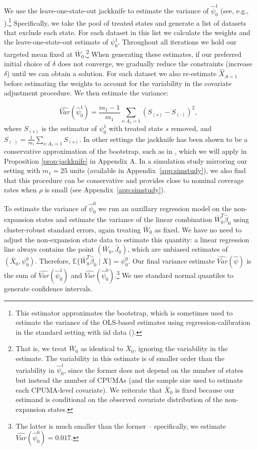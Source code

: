 \documentclass[aoas]{imsart}
\theoremstyle{plain}
\theoremstyle{remark}
\begin{document}
We use the leave-one-state-out jackknife to estimate the variance of $\hat{\psi}_0^1$ (see, e.g., \cite{cameron2015practitioner}).\footnote{This estimator approximates the bootstrap, which is sometimes used to estimate the variance of the OLS-based estimates using regression-calibration in the standard setting with iid data (\cite{carroll2006measurement}).} Specifically, we take the pool of treated states and generate a list of datasets that exclude each state. For each dataset in this list we calculate the weights and the leave-one-state-out estimate of $\psi_0^1$. Throughout all iterations we hold our targeted mean fixed at $\bar{W}_0$.\footnote{That is, we treat $\bar{W}_0$ as identical to $\bar{X}_0$, ignoring the variability in the estimate. The variability in this estimate is of smaller order than the variability in $\hat{\psi}_0^1$, since the former does not depend on the number of states but instead the number of CPUMAs (and the sample size used to estimate each CPUMA-level covariate). We reiterate that $\bar{X}_0$ is fixed because our estimand is conditional on the observed covariate distribution of the non-expansion states.} When generating these estimates, if our preferred initial choice of $\delta$ does not converge, we gradually reduce the constraints (increase $\delta$) until we can obtain a solution. For each dataset we also re-estimate $\hat{X}_{A=1}$ before estimating the weights to account for the variability in the covariate adjustment procedure. We then estimate the variance:

\begin{equation}\label{eqn:jackknife}
 \hat{Var}(\hat{\psi}_0^1) = \frac{m_1 - 1}{m_1} \sum_{s:A_s = 1} \left( S_{(s)} - S_{(\cdot)} \right)^2,
\end{equation}
%
where $S_{(s)}$ is the estimator of $\psi_0^1$ with treated state $s$ removed, and $S_{(\cdot)} = \frac{1}{m_1} \sum_{s:A_s=1} S_{(s)}$. In other settings the jackknife has been shown to be a conservative approximation of the bootstrap, such as in \cite{efron1981jackknife}, which we will apply in Proposition \ref{prop:jackknife} in Appendix A. In a simulation study mirroring our setting with $m_1 = 25$ units (available in Appendix~\ref{app:simstudy}), we also find that this procedure can be conservative and provides close to nominal coverage rates when $\rho$ is small (see Appendix~\ref{app:simstudy}).

To estimate the variance of $\hat{\psi}_0^0$ we run an auxillary regression model on the non-expansion states and estimate the variance of the linear combination $\bar{W}_0^T\hat{\beta}_0$ using cluster-robust standard errors, again treating $\bar{W}_0$ as fixed. We have no need to adjust the non-expansion state data to estimate this quantity: a linear regression line always contains the point $(\bar{W}_0, \bar{J}_0)$, which are unbiased estimates of $(\bar{X}_0, \psi_0^0)$. Therefore, $\mathbb{E}\{\bar{W}_0^T\hat{\beta}_0 \mid X\} = \psi_0^0$. Our final variance estimate $\hat{Var}(\hat{\psi})$ is the sum of $\hat{Var}(\hat{\psi}_0^1)$ and $\hat{Var}(\hat{\psi}_0^0)$.\footnote{The latter is much smaller than the former -- specifically, we estimate $\hat{Var}(\hat{\psi}_0^0) = 0.017$.} We use standard normal quantiles to generate confidence intervals.
\end{document}
